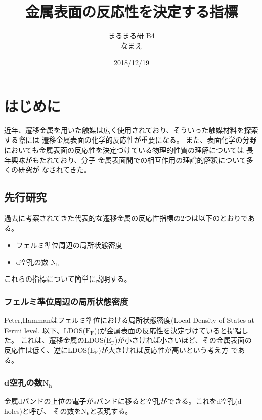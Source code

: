 \documentclass[12pt]{ltjsarticle}
\begin{document}
\begin{titlepage}
\title{金属表面の反応性を決定する指標}
\author{まるまる研 B4 \\ なまえ}
\date{2018/12/19}
\maketitle
\tableofcontents

\end{titlepage}

\section{はじめに}
近年、遷移金属を用いた触媒は広く使用されており、そういった触媒材料を探索する際には
遷移金属表面の化学的反応性が重要になる。
また、表面化学の分野においても金属表面の反応性を決定づけている物理的性質の理解については
長年興味がもたれており、分子-金属表面間での相互作用の理論的解釈について多くの研究が
なされてきた。 \\

\subsection{先行研究}

過去に考案されてきた代表的な遷移金属の反応性指標の2つは以下のとおりである。

\begin{itemize}
 \item フェルミ準位周辺の局所状態密度
 \item d空孔の数 $\text{N}_\text{h}$
\end{itemize}

これらの指標について簡単に説明する。

\subsubsection{フェルミ準位周辺の局所状態密度}
Peter,Hammanはフェルミ準位における局所状態密度(Local Density of States at Fermi level.
以下、LDOS($\text{E}_\text{F}$))が金属表面の反応性を決定づけていると提唱した。
これは、遷移金属のLDOS($\text{E}_\text{F}$)が小さければ小さいほど、その金属表面の
反応性は低く、逆にLDOS($\text{E}_\text{F}$)が大きければ反応性が高いという考え方
である。\cite{PeterJ.Feibelman1984}

\subsubsection{d空孔の数$\text{N}_\text{h}$}
金属dバンドの上位の電子がsバンドに移ると空孔ができる。これをd空孔(d-holes)と呼び、
その数を$\text{N}_\text{h}$と表現する。
\end{document}
